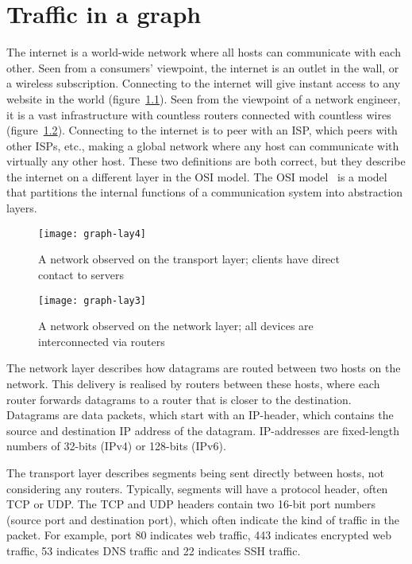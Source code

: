 \chapter{Traffic in a graph}
\label{chp:traffic}

The internet is a world-wide network where all hosts can communicate with each other.
Seen from a consumers' viewpoint, the internet is an outlet in the wall, or a wireless subscription.
Connecting to the internet will give instant access to any website in the world (figure~\ref{fig:graph-lay4}).
Seen from the viewpoint of a network engineer, it is a vast infrastructure with countless routers connected with countless wires (figure~\ref{fig:graph-lay3}).
Connecting to the internet is to peer with an ISP, which peers with other ISPs, etc.,
 making a global network where any host can communicate with virtually any other host.
These two definitions are both correct, but they describe the internet on a different layer in the OSI model.
The OSI model~\cite{zimmermann1980osi} is a model that partitions the internal functions of a communication system into abstraction layers.

\begin{figure}[h]
	\caption{A network observed on the transport layer; clients have direct contact to servers}
	\label{fig:graph-lay4}
	\centering
		\texttt{[image: graph-lay4]}
\end{figure}

\begin{figure}[h]
	\caption{A network observed on the network layer; all devices are interconnected via routers}
	\label{fig:graph-lay3}
	\centering
		\texttt{[image: graph-lay3]}
\end{figure}

The network layer describes how datagrams are routed between two hosts on the network.
This delivery is realised by routers between these hosts,
 where each router forwards datagrams to a router that is closer to the destination.
Datagrams are data packets, which start with an IP-header,
 which contains the source and destination IP address of the datagram.
IP-addresses are fixed-length numbers of 32-bits (IPv4) or 128-bits (IPv6).

The transport layer describes segments being sent directly between hosts,
 not considering any routers.
Typically, segments will have a protocol header, often TCP or UDP.
The TCP and UDP headers contain two 16-bit port numbers (source port and destination port),
which often indicate the kind of traffic in the packet.
For example,
 port 80 indicates web traffic,
 443 indicates encrypted web traffic,
 53 indicates DNS traffic and 22 indicates SSH traffic.


